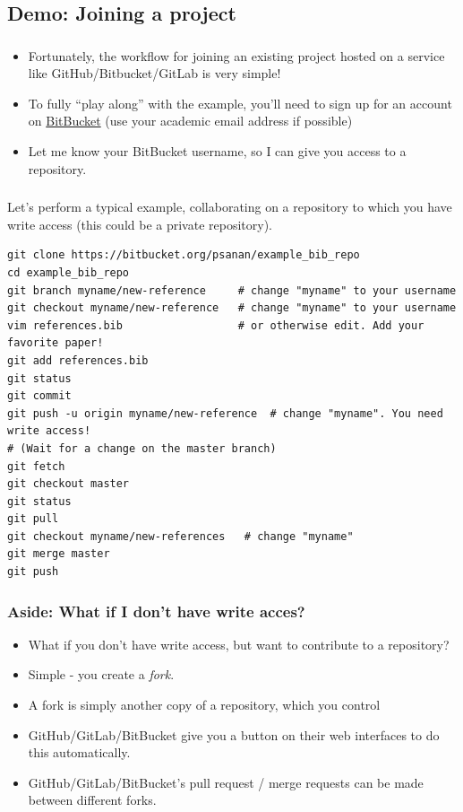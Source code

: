 \documentclass{beamer}
\begin{document}
\subsection{Demo: Joining a project}

\begin{frame}[fragile]
\frametitle{}
\begin{itemize}
\item Fortunately, the workflow for joining an existing project hosted on a service like GitHub/Bitbucket/GitLab is very simple!
\item To fully ``play along'' with the example, you'll need to sign up for an account on \href{bitbucket.org}{BitBucket} (use your academic email address if possible)
\item Let me know your BitBucket username, so I can give you access to a repository.
\end{itemize}
\end{frame}

\begin{frame}[fragile]
\frametitle{}
Let's perform a typical example, collaborating on a repository to which you have write access (this could be a private repository).
\begin{lstlisting}
git clone https://bitbucket.org/psanan/example_bib_repo
cd example_bib_repo
git branch myname/new-reference     # change "myname" to your username
git checkout myname/new-reference   # change "myname" to your username
vim references.bib                  # or otherwise edit. Add your favorite paper!
git add references.bib
git status
git commit
git push -u origin myname/new-reference  # change "myname". You need write access!
# (Wait for a change on the master branch)
git fetch
git checkout master
git status
git pull
git checkout myname/new-references   # change "myname"
git merge master
git push
\end{lstlisting}
\end{frame}

\begin{frame}[fragile]
\frametitle{Aside: What if I don't have write acces?}
\begin{itemize}
\item What if you don't have write access, but want to contribute to a repository?
\item Simple - you create a \emph{fork}.
\item A fork is simply another copy of a repository, which you control
\item GitHub/GitLab/BitBucket give you a button on their web interfaces to do this automatically.
\item GitHub/GitLab/BitBucket's pull request / merge requests can be made between different forks.
\end{itemize}
\end{frame}
\end{document}
